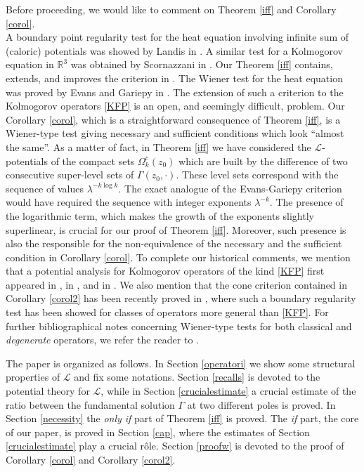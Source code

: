 \documentclass[10pt]{amsart}
\def\elle{\mathcal{L}}
\numberwithin{equation}{section}
\begin{document}
\vskip 0.4cm

\noindent Before proceeding, we would like to comment on Theorem \ref{iff} and Corollary \ref{corol}.\\
A boundary point regularity test for the heat equation involving infinite sum of (caloric) potentials was showed by Landis in \cite{La}. A similar test for a Kolmogorov equation in $\mathbb R^3$ was obtained by Scornazzani in \cite{Sc}. Our Theorem \ref{iff} contains, extends, and improves the criterion in \cite{Sc}. The Wiener test for the heat equation was proved by Evans and Gariepy in \cite{EG}. The extension of such a criterion to the Kolmogorov operators \eqref{KFP} is an open, and seemingly difficult, problem. Our Corollary \ref{corol}, which is a straightforward consequence of Theorem \ref{iff}, is a Wiener-type test giving necessary and sufficient conditions which look ``almost the same''. As a matter of fact, in Theorem \ref{iff} we have considered the $\elle$-potentials of the compact sets $\Omega^c_k(z_0)$ which are built by the difference of two consecutive super-level sets of $\Gamma(z_0,\cdot)$. These level sets correspond with the sequence of values $\lambda^{-k\log{k}}$. The exact analogue of the Evans-Gariepy criterion would have required the sequence with integer exponents $\lambda^{-k}$. The presence of the logarithmic term, which makes the growth of the exponents slightly superlinear, is crucial for our proof of Theorem \ref{iff}. Moreover, such presence is also the responsible for the non-equivalence of the necessary and the sufficient condition in Corollary \ref{corol}. To complete our historical comments, we mention that a potential analysis for Kolmogorov operators of the kind \eqref{KFP} first appeared in \cite{Sc}, in \cite{GL90}, and in \cite{LP}. We also  mention that the cone criterion contained in Corollary  \ref{corol2} has been recently proved
in \cite{K16}, where such a boundary regularity test has been showed for classes of operators more general than  \eqref{KFP}.  For further bibliographical notes concerning Wiener-type tests for both classical and \emph{degenerate} operators, we refer the reader to \cite{LTU}. 


The paper is organized as follows. In Section \ref{operatori} we show some structural properties of $\elle$ and fix some notations. Section \ref{recalls} is devoted to the potential theory for $\elle$, while in Section \ref{crucialestimate} a crucial estimate of the ratio between the fundamental solution $\Gamma$ at two different poles is proved.  In Section \ref{necessity} the {\it only if} part of Theorem \ref{iff} is proved. The {\it if} part, the core of our paper, is proved in Section \ref{cap}, where the estimates of Section \ref{crucialestimate} play a crucial r\^ole. Section \ref{proofw} is devoted to the proof of Corollary \ref{corol} and Corollary \ref{corol2}.
\end{document}
